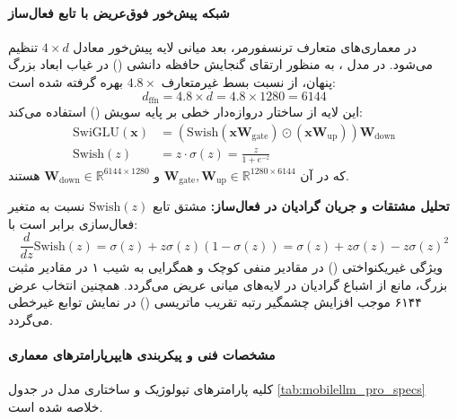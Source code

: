 \paragraph*{شبکه پیش‌خور فوق‌عریض با تابع فعال‌ساز }
در معماری‌های متعارف ترنسفورمر، بعد میانی لایه پیش‌خور معادل $4 \times d$ تنظیم می‌شود. در مدل ، به منظور ارتقای گنجایش حافظه دانشی () در غیاب ابعاد بزرگ پنهان، از نسبت بسط غیرمتعارف $4.8\times$ بهره گرفته شده است:
\begin{equation}
    d_{\text{ffn}} = 4.8 \times d = 4.8 \times 1280 = 6144
\end{equation}
این لایه از ساختار دروازه‌دار خطی بر پایه سویش () استفاده می‌کند:
\begin{align}
    \text{SwiGLU}(\mathbf{x}) &= \left(\text{Swish}(\mathbf{x}\mathbf{W}_{\text{gate}}) \odot (\mathbf{x}\mathbf{W}_{\text{up}})\right) \mathbf{W}_{\text{down}} \\
    \text{Swish}(z) &= z \cdot \sigma(z) = \frac{z}{1 + e^{-z}}
\end{align}
که در آن $\mathbf{W}_{\text{gate}}, \mathbf{W}_{\text{up}} \in \mathbb{R}^{1280 \times 6144}$ و $\mathbf{W}_{\text{down}} \in \mathbb{R}^{6144 \times 1280}$ هستند.

\textbf{تحلیل مشتقات و جریان گرادیان در فعال‌ساز:}
مشتق تابع $\text{Swish}(z)$ نسبت به متغیر فعال‌سازی برابر است با:
\begin{equation}
    \frac{d}{dz}\text{Swish}(z) = \sigma(z) + z\sigma(z)(1 - \sigma(z)) = \sigma(z) + z\sigma(z) - z\sigma(z)^2
\end{equation}
ویژگی غیریکنواختی () در مقادیر منفی کوچک و همگرایی به شیب ۱ در مقادیر مثبت بزرگ، مانع از اشباع گرادیان در لایه‌های میانی عریض می‌گردد. همچنین انتخاب عرض ۶۱۴۴ موجب افزایش چشمگیر رتبه تقریب ماتریسی () در نمایش توابع غیرخطی می‌گردد.

\paragraph*{مشخصات فنی و پیکربندی هایپرپارامترهای معماری}
کلیه پارامترهای تپولوژیک و ساختاری مدل  در جدول \ref{tab:mobilellm_pro_specs} خلاصه شده است.

